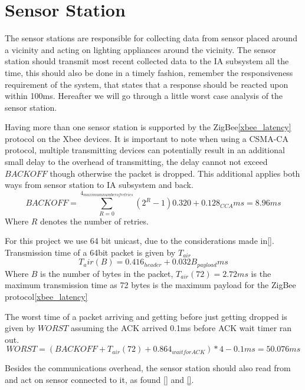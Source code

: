 \section{Sensor Station}\label{sub:sensorStation}

The sensor stations are responsible for collecting data from sensor placed around a vicinity and acting on lighting appliances around the vicinity. The sensor station should transmit most recent collected data to the IA subsystem all the time, this should also be done in a timely fashion, remember the responsiveness requirement of the system, that states that a response should be reacted upon within 100ms. Hereafter we will go through a little worst case analysis of the sensor station.


Having more than one sensor station is supported by the ZigBee\cref{xbee_latency} protocol on the Xbee devices. It is important to note when using a CSMA-CA protocol, multiple transmitting devices can potentially result in an additional small delay to the overhead of transmitting, the delay cannot not exceed $BACKOFF$ though otherwise the packet is dropped. This additional applies both ways from sensor station to IA subsystem and back.
\begin{equation*}
BACKOFF = \sum\limits_{R=0}^{4_{maximum number of retries}}(2^{R} - 1) 0.320 + 0.128_{CCA} ms = 8.96 ms
\end{equation*}
Where $R$ denotes the number of retries.

For this project we use 64 bit unicast, due to the considerations made in\cref{}.
Transmission time of a 64bit packet is given by $T_{air}$
\begin{equation*}
T_air(B) = 0.416_{header} + 0.032B_{payload} ms
\end{equation*}
Where $B$ is the number of bytes in the packet, $T_{air}(72) = 2.72 ms$ is the maximum transmission time as 72 bytes is the maximum payload for the ZigBee protocol\cref{xbee_latency}

The worst time of a packet arriving and getting before just getting dropped is given by $WORST$ assuming the ACK arrived 0.1ms before ACK wait timer ran out.
\begin{equation*}
WORST = (BACKOFF + T_{air}(72) + 0.864_{wait for ACK})*4 - 0.1 ms = 50.076 ms
\end{equation*}

Besides the communications overhead, the sensor station should also read from and act on sensor connected to it,  as found \cref{} and \cref{}.

